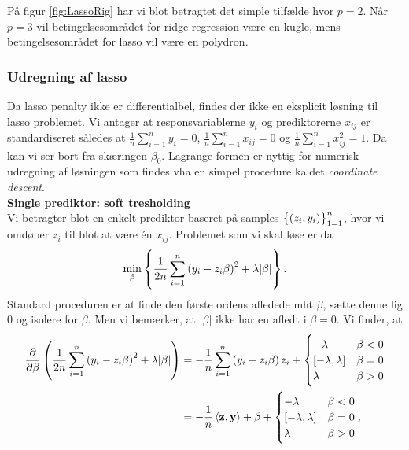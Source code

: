 På figur \ref{fig:LassoRig} har vi blot betragtet det simple tilfælde hvor $p=2$. Når $p=3$ vil betingelsesområdet for ridge regression være en kugle, mens betingelsesområdet for lasso vil være en polydron. 

\subsubsection{Udregning af lasso}
Da lasso penalty ikke er differentialbel, findes der ikke en eksplicit løsning til lasso problemet.
Vi antager at responsvariablerne $y_i$ og prediktorerne $x_{ij}$ er standardiseret således at \(\frac{1}{n} \sum_{i=1}^n y_{i} = 0\), \(\frac{1}{n} \sum_{i=1}^n x_{ij} = 0\) og \(\frac{1}{n} \sum_{i=1}^n x_{ij}^2=1\).
Da kan vi ser bort fra skæringen $\beta_0$.
Lagrange formen er nyttig for numerisk udregning af løsningen som findes vha en simpel procedure kaldet \textit{coordinate descent}. \\
%
\textbf{Single prediktor: soft tresholding} \\
Vi betragter blot en enkelt prediktor baseret på samples $\cbr{\del{z_i, y_i}}_{1=1}^n$, hvor vi omdøber $z_i$ til blot at være én $x_{ij}$.
Problemet som vi skal løse er da
\begin{align*}
\min_{\beta} \cbr{\frac{1}{2n} \sum_{i=1}^n \del{y_i - z_{i} \beta}^2 + \lambda \vert \beta \vert}.
\end{align*}
Standard proceduren er at finde den første ordens afledede mht $\beta$, sætte denne lig 0 og isolere for $\beta$. Men vi bemærker, at \(\vert \beta \vert \) ikke har en afledt i $\beta=0$.
Vi finder, at
\begin{align*}
\frac{\partial}{\partial \beta} \del{\frac{1}{2n} \sum_{i=1}^n \del{y_i - z_{i} \beta}^2 + \lambda \vert \beta \vert}
&= -\frac{1}{n} \sum_{i=1}^n \del{y_i - z_{i} \beta} z_i + \begin{cases}
-\lambda \quad &\beta < 0 \\
[-\lambda, \lambda] & \beta = 0 \\
\lambda & \beta >0 
\end{cases}  \\
&= -\frac{1}{n} \left\langle \mathbf{z}, \mathbf{y} \right\rangle + \beta + \begin{cases}
-\lambda \quad &\beta < 0 \\
[-\lambda, \lambda] & \beta = 0 \\
\lambda & \beta >0 
\end{cases},
\end{align*}
